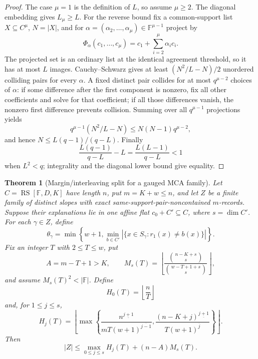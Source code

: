 \documentclass[11pt,a4paper]{amsart}
\numberwithin{equation}{section}
\newtheorem{theorem}{Theorem}[section]
\theoremstyle{remark}
\DeclareMathOperator{\RS}{RS}\DeclareMathOperator{\MCA}{MCA}\DeclareMathOperator{\CA}{CA}
\newcommand{\F}{\mathbb F}\newcommand{\B}{\mathbb B}\newcommand{\K}{\mathbb K}\newcommand{\Z}{\mathbb Z}
\begin{document}
\begin{proof}
The case \(\mu=1\) is the definition of \(L\), so assume \(\mu\geq2\).
The diagonal embedding gives \(L_\mu\geq L\).  For the reverse bound fix
a common-support list \(X\subseteq C^\mu\), \(N=|X|\), and for
\(\alpha=(\alpha_2,\ldots,\alpha_\mu)\in\F^{\mu-1}\) project by
\[
 \Phi_\alpha(c_1,\ldots,c_\mu)
 =c_1+\sum_{i=2}^\mu\alpha_i c_i.
\]
The projected set is an ordinary list at the identical agreement
threshold, so it has at most \(L\) images.  Cauchy--Schwarz gives at least
\((N^2/L-N)/2\) unordered colliding pairs for every \(\alpha\).  A fixed
distinct pair collides for at most \(q^{\mu-2}\) choices of \(\alpha\): if
some difference after the first component is nonzero, fix all other
coefficients and solve for that coefficient; if all those differences
vanish, the nonzero first difference prevents collision.  Summing over
all \(q^{\mu-1}\) projections yields
\[
 q^{\mu-1}(N^2/L-N)\leq N(N-1)q^{\mu-2},
\]
and hence \(N\leq L(q-1)/(q-L)\).  Finally
\[
 \frac{L(q-1)}{q-L}-L=\frac{L(L-1)}{q-L}<1
\]
when \(L^2<q\); integrality and the diagonal lower bound give equality.
\end{proof}

\begin{theorem}[Margin/interleaving split for a gauged MCA family]
\label{thm:mca-margin-interleaving-split}
Let \(C=\RS[\F,D,K]\) have length \(n\), put \(m=K+w\leq n\), and
let \(Z\) be a finite family of distinct slopes with exact
same-support-pair-noncontained \(m\)-records.  Suppose their explanations
lie in one affine flat \(c_0+C'\subseteq C\), where
\(s=\dim C'\).  For each \(\gamma\in Z\), define
\[
 \theta_\gamma=
 \min\left\{w+1,
 \min_{b\in C'}|\{x\in S_\gamma:r_1(x)\ne b(x)\}|\right\}.
\]
Fix an integer \(T\) with \(2\leq T\leq w\), put
\[
 A=m-T+1>K,
 \qquad
 M_s(T)=
 \left\lfloor
 \frac{\binom{n-K+s}{s}}{\binom{w-T+1+s}{s}}
 \right\rfloor,
\]
and assume \(M_s(T)^2<|\F|\).  Define
\[
 H_0(T)=\left\lfloor\frac nT\right\rfloor
\]
and, for \(1\leq j\leq s\),
\[
 H_j(T)=\left\lfloor\max\left\{
 \frac{n^{\underline{j+1}}}
 {mT(w+1)^{\overline{j-1}}},
 \frac{(n-K+j)^{\underline{j+1}}}
 {T(w+1)^{\overline j}}
 \right\}\right\rfloor .
\]
Then
\begin{equation}
 |Z|\leq
 \max_{0\leq j\leq s}H_j(T)+(n-A)M_s(T).
 \label{eq:mca-margin-interleaving-split}
\end{equation}
\end{theorem}
\end{document}
